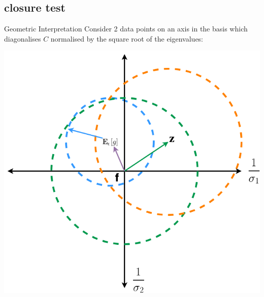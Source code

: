 \subsection{closure test}
\begin{frame}{Geometric Interpretation}
    Consider 2 data points on an axis in the basis which diagonalises $C$ normalised by the square root of the eigenvalues:

    \begin{center}
        \includegraphics[scale=0.3]{closure_test/testdiaggram.png}
    \end{center}
\end{frame}
